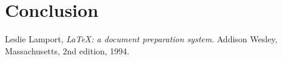 \documentclass[11pt,a4paper]{article}
\begin{document}
\section{Conclusion}


\begin{thebibliography}{9}

  Leslie Lamport,
  \emph{\LaTeX: a document preparation system}.
  Addison Wesley, Massachusetts,
  2nd edition,
  1994.

\end{thebibliography}
\end{document}
